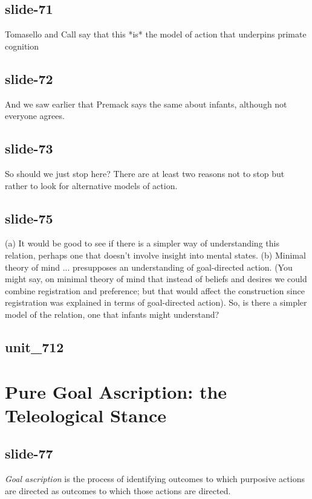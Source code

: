 \documentclass[12pt,\papersize]{extarticle}
\begin{document}
 
\subsection{slide-71}
Tomasello and Call say that this *is* the model of action that underpins primate cognition
 
 
\subsection{slide-72}
And we saw earlier that Premack says the same about infants, although not everyone agrees.
 
 
\subsection{slide-73}
So should we just stop here?
There are at least two reasons not to stop but rather to look for alternative models of action.
 
 
\subsection{slide-75}
(a) It would be good to see if there is a simpler way of understanding this relation, perhaps one that doesn't involve insight into mental states.
(b) Minimal theory of mind ... presupposes an understanding of goal-directed action.
(You might say, on minimal theory of mind that instead of beliefs and desires we could combine registration and preference; but that would affect the construction since registration was explained in terms of goal-directed action).
So, is there a simpler model of the relation, one that infants might understand?
 
 
\subsection{unit\_712}
 
\section{Pure Goal Ascription: the Teleological Stance}
 
 
\subsection{slide-77}
\newcommand{\dfGoalAscription}{\emph{Goal ascription} is the process of identifying outcomes to which purposive actions are directed as outcomes to which those actions are directed.}
\dfGoalAscription{}
 
\end{document}
